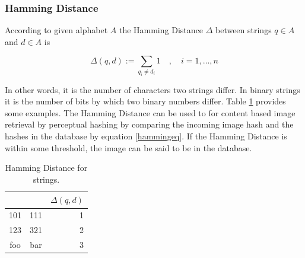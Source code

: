 \documentclass[english,12pt,a4paper,pdftex,elec,utf8, table]{aaltothesis}
\begin{document}
\subsubsection{Hamming Distance}\label{HammingSection}
According to \cite{Hamming1950} given alphabet $A$ the Hamming Distance $\Delta$ between strings $q \in A$ and $d \in A$ is

\begin{equation}\label{hammingeq}
\Delta(q,d):=\sum_{q_i\neq d_i}1\quad,\quad i=1,\ldots,n
\end{equation}

In other words, it is the number of characters two strings differ. In binary strings it is the number of bits by which two binary numbers differ. Table \ref{hammingexamples} provides some examples. The Hamming Distance can be used to for content based image retrieval by perceptual hashing by comparing the incoming image hash and the hashes in the database by equation \ref{hammingeq}. If the Hamming Distance is within some threshold, the image can be said to be in the database.

\begin{table}[htb]
\caption{Hamming Distance for strings.}
\label{hammingexamples}
\begin{center}
  \begin{tabular}{ccr}
&&$\Delta(q,d)$\\
    \hline \hline
    101 & 111 & 1\\
    \hline
    123 & 321 & 2\\
    \hline
    foo & bar & 3\\
    \hline
\end{tabular}
\end{center}\end{table}
\end{document}
